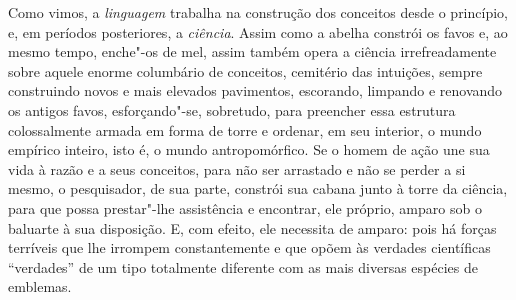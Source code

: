 \sectionitem
\noindent Como vimos, a \textit{linguagem} trabalha na construção dos conceitos
desde o princípio, e, em períodos posteriores, a \textit{ciência}.
Assim como a abelha constrói os favos e, ao mesmo tempo, enche"-os de
mel, assim também opera a ciência irrefreadamente sobre aquele enorme
columbário de conceitos, cemitério das intuições, sempre construindo
novos e mais elevados pavimentos, escorando, limpando e renovando os
antigos favos, esforçando"-se, sobretudo, para preencher essa
estrutura colossalmente armada em forma de torre e ordenar, em seu
interior, o mundo empírico inteiro, isto é, o mundo antropomórfico. Se
o homem de ação une sua vida à razão e a seus conceitos, para não ser
arrastado e não se perder a si mesmo, o pesquisador, de sua parte,
constrói sua cabana junto à torre da ciência, para que possa
prestar"-lhe assistência e encontrar, ele próprio, amparo sob o
baluarte à sua disposição. E, com efeito, ele necessita de amparo: pois
há forças terríveis que lhe irrompem constantemente e que opõem às
verdades científicas “verdades” de um tipo totalmente diferente com as
mais diversas espécies de emblemas.

